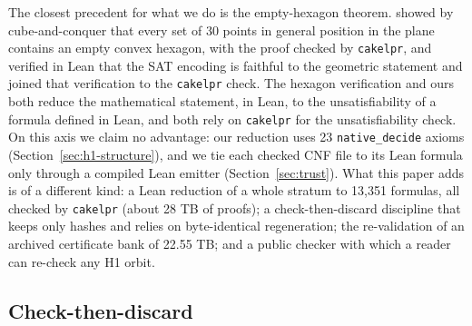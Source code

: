 \documentclass{anvil-paper}
\newcommand{\cakelpr}{\texttt{cake\textunderscore lpr}}
\theoremstyle{definition}
\begin{document}
The closest precedent for what we do is the empty-hexagon theorem. \citet{heule2024hexagon} showed by cube-and-conquer \citep{heule2011cube} that every set of 30 points in general position in the plane contains an empty convex hexagon, with the proof checked by \cakelpr{}, and \citet{subercaseaux2024hexagonlean} verified in Lean that the SAT encoding is faithful to the geometric statement and joined that verification to the \cakelpr{} check. The hexagon verification and ours both reduce the mathematical statement, in Lean, to the unsatisfiability of a formula defined in Lean, and both rely on \cakelpr{} for the unsatisfiability check. On this axis we claim no advantage: our reduction uses 23 \texttt{native\_decide} axioms (Section~\ref{sec:h1-structure}), and we tie each checked CNF file to its Lean formula only through a compiled Lean emitter (Section~\ref{sec:trust}). What this paper adds is of a different kind: a Lean reduction of a whole stratum to 13,351 formulas, all checked by \cakelpr{} (about 28 TB of proofs); a check-then-discard discipline that keeps only hashes and relies on byte-identical regeneration; the re-validation of an archived certificate bank of 22.55 TB; and a public checker with which a reader can re-check any H1 orbit.

\subsection{Check-then-discard}\label{sec:method}
\end{document}
